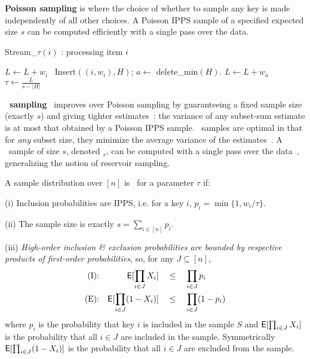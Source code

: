 \documentclass[11pt]{article}
\begin{document}
\medskip
\noindent
{\bf Poisson sampling} is where
the choice of whether to sample any key is made independently of all
other choices.
A Poisson IPPS sample of a specified expected size $s$ can be
 computed efficiently with a single pass over the data.


\begin{algorithm}[t]
\caption{{\sc Stream\_$\tau$}$(i)$ : processing item $i$}\label{get_tau_k:alg}
\begin{algorithmic}[1]
 $L\leftarrow L + w_i$
\Else \, Insert$((i,w_i),H)$;
\EndIf
{} \label{linewhile}
\State $a \leftarrow $ delete\_min$(H)$.
\State $L \leftarrow  L+w_a$
\State $\tau \leftarrow \frac{L}{s-|H|}$ \label{line_get_tau}
\EndWhile
\end{algorithmic}
\end{algorithm}

\medskip
\noindent
{\bf \varopt\ sampling}~\cite{Cha82,Tille:book,varopt:CDKLT08}
 improves over Poisson sampling by guaranteeing a fixed
sample size (exactly $s$) and giving tighter
estimates~\cite{varopt:CDKLT08,varopt_full:CDKLT10,Cha82,Tille:book,GandhiKPS:jacm06}: 
the variance of any subset-sum
 estimate is at most that obtained by a Poisson IPPS sample.
\varopt\ samples are optimal in that 
for {\em any} subset size, they minimize the 
average variance of the estimates~\cite{ST07,varopt:CDKLT08}.
A \varopt\ sample of size $s$, denoted \varopt$_s$, 
can be computed with a single pass over the
data~\cite{varopt_full:CDKLT10}, 
generalizing the notion of reservoir sampling. 


\noindent
A sample distribution over $[n]$ is \varopt\ for a parameter $\tau$ if:
 \begin{trivlist}
\item [(i)]
  Inclusion probabilities are IPPS, i.e. for a key $i$,
$p_i=\min\{1,w_i/\tau\}$. 
\item [(ii)]
 The sample size is exactly $s=\sum_{i\in [n]} p_i$. 
\item [(iii)] 
{\em High-order inclusion \& exclusion probabilities are bounded 
 by respective products of first-order probabilities}, so, 
for any $J\!\subseteq\![n]$, 
\begin{align*}
\mbox{(I):}&&\textsf{E}[\prod_{i\in J} X_i] & \quad \leq \quad \prod_{i\in J} p_i \\
\mbox{(E):}&&\textsf{E}[\prod_{i\in J} (1-X_i)] & \quad \leq \quad  \prod_{i\in J} (1-p_i)
\end{align*}
where $p_i$ is the probability that key $i$ is included
in the sample $S$ and $\textsf{E}[\prod_{i\in J} X_i]$
is the probability that all $i\in J$
are included in the sample. Symmetrically
$\textsf{E}[\prod_{i\in J} (1-X_i)]$ is the probability 
that all $i\in J$ are excluded from the sample. 
 \end{trivlist}
\end{document}
